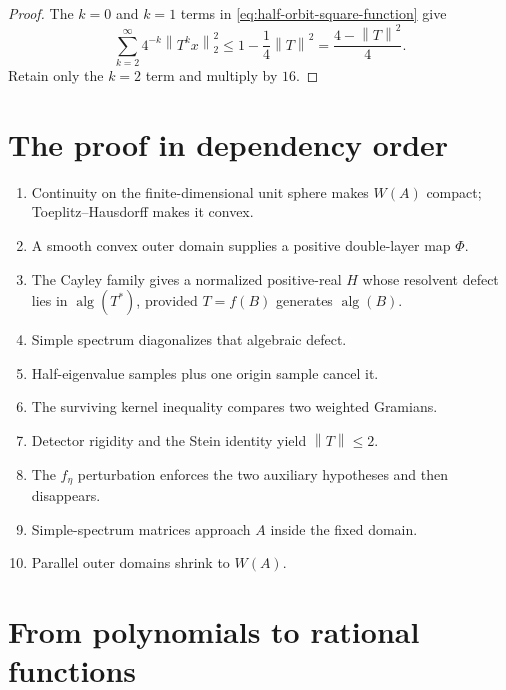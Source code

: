 \documentclass[11pt,oneside,openany]{book}
\theoremstyle{definition}
\theoremstyle{remark}
\newcommand{\alg}{\operatorname{alg}}
\newcommand{\norm}[1]{\left\lVert #1\right\rVert}
\begin{document}
\begin{proof}
The \(k=0\) and \(k=1\) terms in
\eqref{eq:half-orbit-square-function} give
\[
  \sum_{k=2}^{\infty}4^{-k}\norm{T^kx}_2^2
  \leq
  1-\frac14\norm{T}^2
  =
  \frac{4-\norm{T}^2}{4}.
\]
Retain only the \(k=2\) term and multiply by \(16\).
\end{proof}

\section{The proof in dependency order}

\clearpage
\begin{proofmap}
\begin{enumerate}
  \item Continuity on the finite-dimensional unit sphere makes
  \(W(A)\) compact; Toeplitz--Hausdorff makes it convex.
  \item A smooth convex outer domain supplies a positive double-layer
  map \(\Phi\).
  \item The Cayley family gives a normalized positive-real \(H\) whose
  resolvent defect lies in \(\alg(T^*)\), provided
  \(T=f(B)\) generates \(\alg(B)\).
  \item Simple spectrum diagonalizes that algebraic defect.
  \item Half-eigenvalue samples plus one origin sample cancel it.
  \item The surviving kernel inequality compares two weighted
  Gramians.
  \item Detector rigidity and the Stein identity yield
  \(\norm{T}\leq2\).
  \item The \(f_\eta\) perturbation enforces the two auxiliary
  hypotheses and then disappears.
  \item Simple-spectrum matrices approach \(A\) inside the fixed
  domain.
  \item Parallel outer domains shrink to \(W(A)\).
\end{enumerate}
\end{proofmap}

\section{From polynomials to rational functions}
\end{document}
